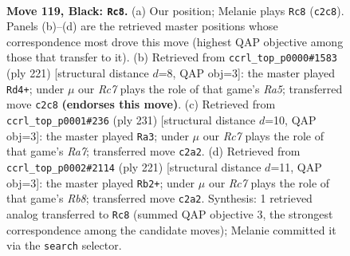 \documentclass[11pt]{article}
\begin{document}
\clearpage

\begin{figure}[p]\centering
\begin{subfigure}{0.46\textwidth}\centering
\resizebox{\linewidth}{!}{%
\newchessgame
\chessboard[
  setfen={1k6/3R4/4p3/4P3/5P1R/8/2r5/5K2 b - - 24 119},
  showmover=false,
  pgfstyle=straightmove, color=movearrow, markmove={c2-c8}
]}
\caption{}
\end{subfigure}\hfill
\begin{subfigure}{0.46\textwidth}\centering
\resizebox{\linewidth}{!}{%
\newchessgame
\chessboard[
  setfen={8/5R2/8/4k3/r5p1/6P1/3K1P2/8 b - - 24 111},
  showmover=false,
  pgfstyle=straightmove, color=movearrow, markmove={a4-d4}
]}
\caption{}
\end{subfigure}
\\[4pt]
\begin{subfigure}{0.46\textwidth}\centering
\resizebox{\linewidth}{!}{%
\newchessgame
\chessboard[
  setfen={8/8/2R5/4p1k1/4P3/5PK1/r7/8 b - - 0 116},
  showmover=false,
  pgfstyle=straightmove, color=movearrow, markmove={a2-a3}
]}
\caption{}
\end{subfigure}\hfill
\begin{subfigure}{0.46\textwidth}\centering
\resizebox{\linewidth}{!}{%
\newchessgame
\chessboard[
  setfen={7R/8/6k1/6p1/4P3/5P2/6K1/1r6 b - - 60 111},
  showmover=false,
  pgfstyle=straightmove, color=movearrow, markmove={b1-b2}
]}
\caption{}
\end{subfigure}
\caption{\textbf{Move 119, Black: \texttt{Rc8}.} (a) Our position; Melanie plays \texttt{Rc8} (\texttt{c2c8}). Panels (b)--(d) are the retrieved master positions whose correspondence most drove this move (highest QAP objective among those that transfer to it). (b) Retrieved from \texttt{ccrl\_top\_p0000\#1583} (ply 221) [structural distance $d$=8, QAP obj=3]: the master played \texttt{Rd4+}; under $\mu$ our \emph{Rc7} plays the role of that game's \emph{Ra5}; transferred move \texttt{c2c8} \textbf{(endorses this move)}. (c) Retrieved from \texttt{ccrl\_top\_p0001\#236} (ply 231) [structural distance $d$=10, QAP obj=3]: the master played \texttt{Ra3}; under $\mu$ our \emph{Rc7} plays the role of that game's \emph{Ra7}; transferred move \texttt{c2a2}. (d) Retrieved from \texttt{ccrl\_top\_p0002\#2114} (ply 221) [structural distance $d$=11, QAP obj=3]: the master played \texttt{Rb2+}; under $\mu$ our \emph{Rc7} plays the role of that game's \emph{Rb8}; transferred move \texttt{c2a2}. Synthesis: 1 retrieved analog transferred to \texttt{Rc8} (summed QAP objective 3, the strongest correspondence among the candidate moves); Melanie committed it via the \texttt{search} selector.}
\label{fig:thought-m237}
\end{figure}
\end{document}
